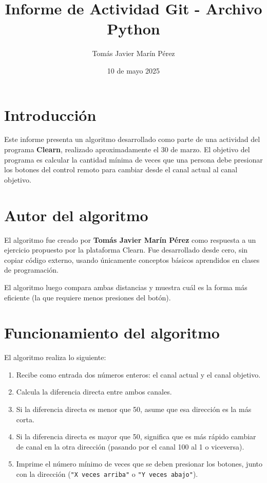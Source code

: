 \documentclass[12pt]{article}
\title{Informe de Actividad Git - Archivo Python}
\author{Tomás Javier Marín Pérez}
\date{10 de mayo 2025}
\begin{document}
\maketitle

\section*{Introducción}

Este informe presenta un algoritmo desarrollado como parte de una actividad del programa \textbf{Clearn}, realizado aproximadamente el 30 de marzo. El objetivo del programa es calcular la cantidad mínima de veces que una persona debe presionar los botones del control remoto para cambiar desde el canal actual al canal objetivo.

\section*{Autor del algoritmo}

El algoritmo fue creado por \textbf{Tomás Javier Marín Pérez} como respuesta a un ejercicio propuesto por la plataforma Clearn. Fue desarrollado desde cero, sin copiar código externo, usando únicamente conceptos básicos aprendidos en clases de programación.

El algoritmo luego compara ambas distancias y muestra cuál es la forma más eficiente (la que requiere menos presiones del botón).

\section*{Funcionamiento del algoritmo}

El algoritmo realiza lo siguiente:
\begin{enumerate}
    \item Recibe como entrada dos números enteros: el canal actual y el canal objetivo.
    \item Calcula la diferencia directa entre ambos canales.
    \item Si la diferencia directa es menor que 50, asume que esa dirección es la más corta.
    \item Si la diferencia directa es mayor que 50, significa que es más rápido cambiar de canal en la otra dirección (pasando por el canal 100 al 1 o viceversa).
    \item Imprime el número mínimo de veces que se deben presionar los botones, junto con la dirección (\texttt{"X veces arriba"} o \texttt{"Y veces abajo"}).
\end{enumerate}
\end{document}

